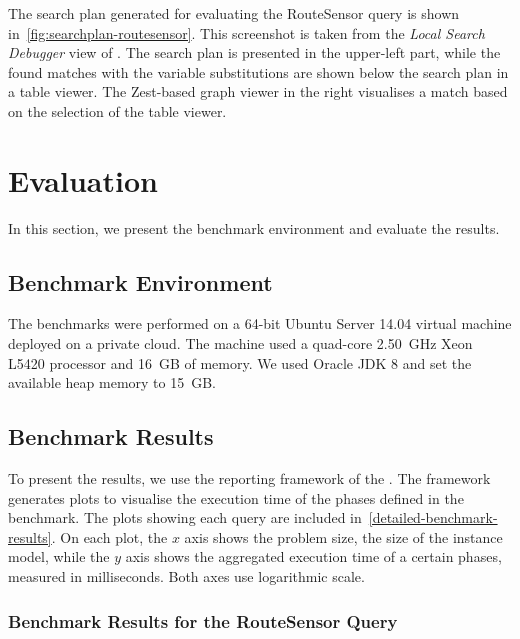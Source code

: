 \documentclass[submission,copyright,creativecommons]{eptcs}
\begin{document}
The search plan generated for evaluating the \textsf{RouteSensor} query is shown in~\autoref{fig:searchplan-routesensor}. This screenshot is taken from the \emph{Local Search Debugger} view of \eiq. The search plan is presented in the upper-left part, while the found matches with the variable substitutions are shown below the search plan in a table viewer. The Zest-based graph viewer in the right visualises a match based on the selection of the table viewer.

\section{Evaluation}

In this section, we present the benchmark environment and evaluate the results. %

\subsection{Benchmark Environment}

The benchmarks were performed on a 64-bit Ubuntu Server 14.04 virtual machine deployed on a private cloud. The machine used a quad-core 2.50~GHz Xeon L5420 processor and 16~GB of memory. We used Oracle JDK 8 and set the available heap memory to 15~GB.

\subsection{Benchmark Results}
\label{benchmark-results}

To present the results, we use the reporting framework of the \tb. The framework generates plots to visualise the execution time of the phases defined in the benchmark. %
The plots showing each query are included in~\autoref{detailed-benchmark-results}. On each plot, the $x$ axis shows the problem size, \ie the size of the instance model, while the $y$ axis shows the aggregated execution time of a certain phases, measured in milliseconds. Both axes use logarithmic scale.

\subsubsection{Benchmark Results for the \textsf{RouteSensor} Query}
\end{document}
